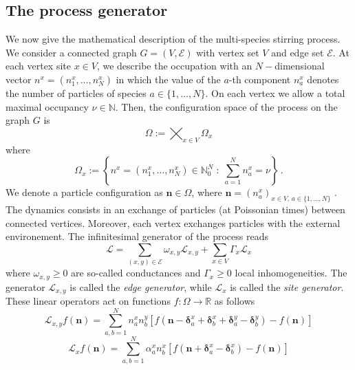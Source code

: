 \documentclass[11pt]{article}
\numberwithin{equation}{section}
\numberwithin{equation}{subsection}
\newcommand{\twoj}{\nu}
\begin{document}
\subsection{The process generator}\label{subsectionGeneratorStr}
We now give the mathematical description of the multi-species stirring process.
We consider a connected graph $G=(V,\mathcal{E})$ with vertex set $V$ and edge set $\mathcal{E}$.
At each vertex site $x\in V$, we describe the occupation with an $N-$dimensional vector $n^{x}=(n_{1}^{x},\ldots,n_{N}^{x})$ in which the value of the $a$-th component $n_{a}^{x}$ denotes the number of particles of species $a\in \{1,\ldots,N\}$. On each vertex we allow a total  maximal occupancy $\nu\in \mathbb{N}$. Then, the configuration space of the process on the graph $G$ is 
\begin{equation}\label{stateSpace}
    \Omega:=\bigtimes_{x\in V} \Omega_{x}
\end{equation}
where
\begin{equation}
\Omega_{x}:=\left\{n^x=(n_{1}^{x},\ldots,n_{N}^{x})\in\mathbb{N}_0^{N}\;:\; \sum_{a=1}^{N}n_{a}^{x}=\twoj\right\}\,.
\end{equation}
We denote a particle configuration as $\bm{n}\in \Omega$, where $\bm{n}=(n_{a}^{x})_{x\in V,\,a\in\{1,\ldots,N\}}$ .\\
The dynamics consists in an exchange of particles (at Poissonian times) between connected vertices. Moreover, each vertex  exchanges particles with the external environement. The infinitesimal generator of the process reads
\begin{equation}\label{Generator}
    \mathcal{L}=\sum_{(x,y)\in \mathcal{E}}\omega_{x,y}\mathcal{L}_{x,y}+\sum_{x\in V}\Gamma_{x}\mathcal{L}_{x}
\end{equation}
where  $ \omega_{x,y}\geq 0$ are so-called conductances and $\Gamma_{x}\geq 0$ local inhomogeneities. The generator $\mathcal{L}_{x,y}$ is called the \textit{edge generator}, while $\mathcal{L}_{x}$ is called the \textit{site generator}. These linear operators act on functions $f:\Omega\to \mathbb{R}$ as follows
\begin{equation}\label{edgeGenerator}
\mathcal{L}_{x,y}f(\bm{n})=\sum_{a,b=1}^{N}n_{a}^{x}n_{b}^{y}\left[f(\bm{n}-\bm{\delta}^{x}_{a}+\bm{\delta}_{b}^{x}+\bm{\delta}_{a}^{y}-\bm{\delta}_{b}^{y})-f(\bm{n})\right]
\end{equation}
\begin{equation}\label{siteGenerator}
    \mathcal{L}_{x}f(\bm{n})=\sum_{a,b=1}^{N}\alpha_{a}^{x}n_{b}^{x}\left[f(\bm{n}+\bm{\delta}_{a}^{x}-\bm{\delta}_{b}^{x})-f(\bm{n})\right]
\end{equation}
\end{document}
